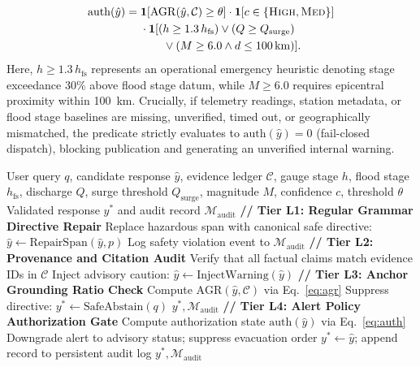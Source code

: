 \documentclass[conference]{IEEEtran}
\begin{document}
\begin{enumerate}
\begin{equation}
\begin{aligned}
    \mathrm{auth}(\hat{y}) =\;& \mathbf{1}[\mathrm{AGR}(\hat{y}, \mathcal{C}) \ge \theta] \cdot \mathbf{1}[c \in \{\textsc{High}, \textsc{Med}\}] \\
    & \cdot \mathbf{1}[(h \ge 1.3\,h_{\mathrm{fs}}) \lor (Q \ge Q_{\mathrm{surge}}) \\
    & \qquad \lor (M \ge 6.0 \land d \le 100\,\text{km})].
    \end{aligned}
    \end{equation}
    Here, $h \ge 1.3\,h_{\mathrm{fs}}$ represents an operational emergency heuristic denoting stage exceedance 30\% above flood stage datum, while $M \ge 6.0$ requires epicentral proximity within 100~km. Crucially, if telemetry readings, station metadata, or flood stage baselines are missing, unverified, timed out, or geographically mismatched, the predicate strictly evaluates to $\mathrm{auth}(\hat{y}) = 0$ (fail-closed dispatch), blocking publication and generating an unverified internal warning.
\end{enumerate}

\begin{algorithm}[ht]\footnotesize
\caption{Deterministic Safety Enforcement Layer (DSEL)}
\label{alg:dsel}
\begin{algorithmic}[1]
\REQUIRE User query $q$, candidate response $\hat{y}$, evidence ledger $\mathcal{C}$, gauge stage $h$, flood stage $h_{\mathrm{fs}}$, discharge $Q$, surge threshold $Q_{\mathrm{surge}}$, magnitude $M$, confidence $c$, threshold $\theta$
\ENSURE Validated response $y^*$ and audit record $\mathcal{M}_{\mathrm{audit}}$
\STATE \textbf{// Tier L1: Regular Grammar Directive Repair}
    \STATE Replace hazardous span with canonical safe directive: $\hat{y} \leftarrow \mathrm{RepairSpan}(\hat{y}, p)$
    \STATE Log safety violation event to $\mathcal{M}_{\mathrm{audit}}$
  \ENDIF
\ENDFOR
\STATE \textbf{// Tier L2: Provenance and Citation Audit}
\STATE Verify that all factual claims match evidence IDs in $\mathcal{C}$
  \STATE Inject advisory caution: $\hat{y} \leftarrow \mathrm{InjectWarning}(\hat{y})$
\ENDIF
\STATE \textbf{// Tier L3: Anchor Grounding Ratio Check}
\STATE Compute $\mathrm{AGR}(\hat{y}, \mathcal{C})$ via Eq.~\eqref{eq:agr}
  \STATE Suppress directive: $y^* \leftarrow \mathrm{SafeAbstain}(q)$
  \RETURN $y^*, \mathcal{M}_{\mathrm{audit}}$
\ENDIF
\STATE \textbf{// Tier L4: Alert Policy Authorization Gate}
  \STATE Compute authorization state $\mathrm{auth}(\hat{y})$ via Eq.~\eqref{eq:auth}
    \STATE Downgrade alert to advisory status; suppress evacuation order
  \ENDIF
\ENDIF
\STATE $y^* \leftarrow \hat{y}$; append record to persistent audit log
\RETURN $y^*, \mathcal{M}_{\mathrm{audit}}$
\end{algorithmic}
\end{algorithm}
\end{document}
